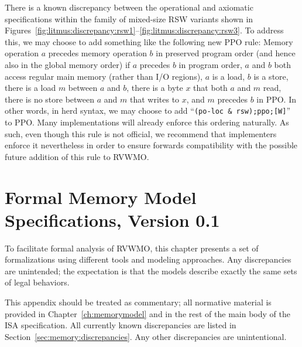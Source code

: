 There is a known discrepancy between the operational and axiomatic specifications within the family of mixed-size RSW variants shown in Figures~\ref{fig:litmus:discrepancy:rsw1}--\ref{fig:litmus:discrepancy:rsw3}.
To address this, we may choose to add something like the following new PPO rule:
Memory operation $a$ precedes memory operation $b$ in preserved program order (and hence also in the global memory order) if $a$ precedes $b$ in program order, $a$ and $b$ both access regular main memory (rather than I/O regions), $a$ is a load, $b$ is a store, there is a load $m$ between $a$ and $b$, there is a byte $x$ that both $a$ and $m$ read, there is no store between $a$ and $m$ that writes to $x$, and $m$ precedes $b$ in PPO.
In other words, in {\sf herd} syntax, we may choose to add ``{\tt (po-loc \& rsw);ppo;[W]}'' to PPO.
Many implementations will already enforce this ordering naturally.
As such, even though this rule is not official, we recommend that implementers enforce it nevertheless in order to ensure forwards compatibility with the possible future addition of this rule to RVWMO.

\chapter{Formal Memory Model Specifications, Version 0.1}
To facilitate formal analysis of RVWMO, this chapter presents a set of formalizations using different tools and modeling approaches.  Any discrepancies are unintended; the expectation is that the models describe exactly the same sets of legal behaviors.

This appendix should be treated as commentary; all normative material is provided in Chapter~\ref{ch:memorymodel} and in the rest of the main body of the ISA specification.
All currently known discrepancies are listed in Section~\ref{sec:memory:discrepancies}.
Any other discrepancies are unintentional.

\clearpage


\clearpage


\clearpage

